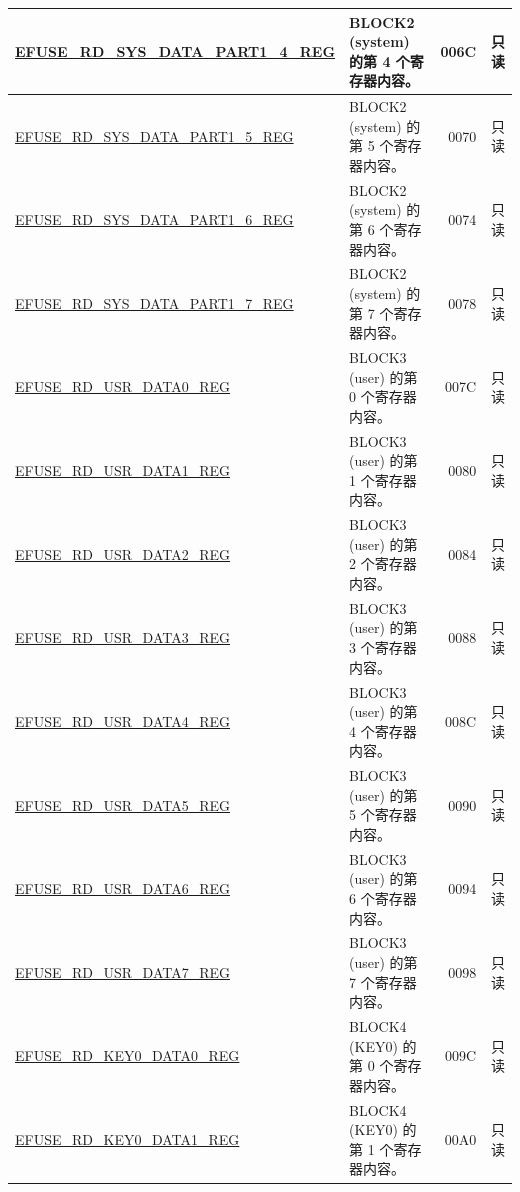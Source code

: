 \begin{longtable}{ | m{6cm} |m{7.2cm} | r| r | }
\hyperref[regdesc:EFUSERDSYSDATAPART1DATA4TO7REG]{EFUSE\_RD\_SYS\_DATA\_PART1\_4\_REG} & BLOCK2 (system) 的第 4 个寄存器内容。 & \hexprefix{}006C & 只读 \\ \hline
\hyperref[regdesc:EFUSERDSYSDATAPART1DATA4TO7REG]{EFUSE\_RD\_SYS\_DATA\_PART1\_5\_REG} & BLOCK2 (system) 的第 5 个寄存器内容。 & \hexprefix{}0070 & 只读 \\ \hline
\hyperref[regdesc:EFUSERDSYSDATAPART1DATA4TO7REG]{EFUSE\_RD\_SYS\_DATA\_PART1\_6\_REG} & BLOCK2 (system) 的第 6 个寄存器内容。 & \hexprefix{}0074 & 只读 \\ \hline
\hyperref[regdesc:EFUSERDSYSDATAPART1DATA4TO7REG]{EFUSE\_RD\_SYS\_DATA\_PART1\_7\_REG} & BLOCK2 (system) 的第 7 个寄存器内容。 & \hexprefix{}0078 & 只读 \\ \hline
\hyperref[regdesc:EFUSERDUSRDATANREG]{EFUSE\_RD\_USR\_DATA0\_REG} & BLOCK3 (user) 的第 0 个寄存器内容。 & \hexprefix{}007C & 只读 \\ \hline
\hyperref[regdesc:EFUSERDUSRDATANREG]{EFUSE\_RD\_USR\_DATA1\_REG} & BLOCK3 (user) 的第 1 个寄存器内容。 & \hexprefix{}0080 & 只读 \\ \hline
\hyperref[regdesc:EFUSERDUSRDATANREG]{EFUSE\_RD\_USR\_DATA2\_REG} & BLOCK3 (user) 的第 2 个寄存器内容。 & \hexprefix{}0084 & 只读 \\ \hline
\hyperref[regdesc:EFUSERDUSRDATANREG]{EFUSE\_RD\_USR\_DATA3\_REG} & BLOCK3 (user) 的第 3 个寄存器内容。 & \hexprefix{}0088 & 只读 \\ \hline
\hyperref[regdesc:EFUSERDUSRDATANREG]{EFUSE\_RD\_USR\_DATA4\_REG} & BLOCK3 (user) 的第 4 个寄存器内容。 & \hexprefix{}008C & 只读 \\ \hline
\hyperref[regdesc:EFUSERDUSRDATANREG]{EFUSE\_RD\_USR\_DATA5\_REG} & BLOCK3 (user) 的第 5 个寄存器内容。 & \hexprefix{}0090 & 只读 \\ \hline
\hyperref[regdesc:EFUSERDUSRDATANREG]{EFUSE\_RD\_USR\_DATA6\_REG} & BLOCK3 (user) 的第 6 个寄存器内容。 & \hexprefix{}0094 & 只读 \\ \hline
\hyperref[regdesc:EFUSERDUSRDATANREG]{EFUSE\_RD\_USR\_DATA7\_REG} & BLOCK3 (user) 的第 7 个寄存器内容。 & \hexprefix{}0098 & 只读 \\ \hline
\hyperref[regdesc:EFUSERDKEY0DATANREG]{EFUSE\_RD\_KEY0\_DATA0\_REG} & BLOCK4 (KEY0) 的第 0 个寄存器内容。 & \hexprefix{}009C & 只读 \\ \hline
\hyperref[regdesc:EFUSERDKEY0DATANREG]{EFUSE\_RD\_KEY0\_DATA1\_REG} & BLOCK4 (KEY0) 的第 1 个寄存器内容。 & \hexprefix{}00A0 & 只读 \\ \hline

\end{longtable}
